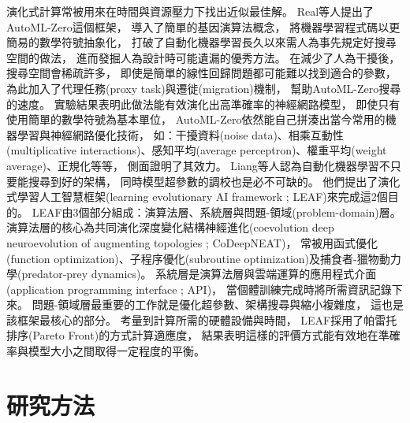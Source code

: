 \documentclass[a4paper,14pt]{extarticle}
\begin{document}
            演化式計算常被用來在時間與資源壓力下找出近似最佳解。
            Real等人\cite{pmlr-v119-real20a}提出了AutoML-Zero這個框架，
            導入了簡單的基因演算法概念，
            將機器學習程式碼以更簡易的數學符號抽象化，
            打破了自動化機器學習長久以來需人為事先規定好搜尋空間的做法，
            進而發掘人為設計時可能遺漏的優秀方法。
            在減少了人為干擾後，
            搜尋空間會稀疏許多，
            即使是簡單的線性回歸問題都可能難以找到適合的參數，
            為此加入了代理任務(proxy task)與遷徙(migration)機制，
            幫助AutoML-Zero搜尋的速度。
            實驗結果表明此做法能有效演化出高準確率的神經網路模型，
            即使只有使用簡單的數學符號為基本單位，
            AutoML-Zero依然能自己拼湊出當今常用的機器學習與神經網路優化技術，
            如：干擾資料(noise data)、相乘互動性(multiplicative interactions)、感知平均(average perceptron)、權重平均(weight average)、正規化等等，
            側面證明了其效力。
            Liang等人\cite{10.1145/3321707.3321721}認為自動化機器學習不只要能搜尋到好的架構，
            同時模型超參數的調校也是必不可缺的。
            他們提出了演化式學習人工智慧框架(learning evolutionary AI framework ; LEAF)來完成這2個目的。
            LEAF由3個部分組成：演算法層、系統層與問題-領域(problem-domain)層。
            演算法層的核心為共同演化深度變化結構神經進化(coevolution deep neuroevolution of augmenting topologies ; CoDeepNEAT)，
            常被用函式優化(function optimization)、子程序優化(subroutine optimization)及捕食者-獵物動力學(predator-prey dynamics)。
            系統層是演算法層與雲端運算的應用程式介面(application programming interface ; API)，
            當個體訓練完成時將所需資訊記錄下來。
            問題-領域層最重要的工作就是優化超參數、架構搜尋與縮小複雜度，
            這也是該框架最核心的部分。
            考量到計算所需的硬體設備與時間，
            LEAF採用了帕雷托排序(Pareto Front)的方式計算適應度，
            結果表明這樣的評價方式能有效地在準確率與模型大小之間取得一定程度的平衡。
        
    \newpage

    \section{研究方法}
\end{document}
